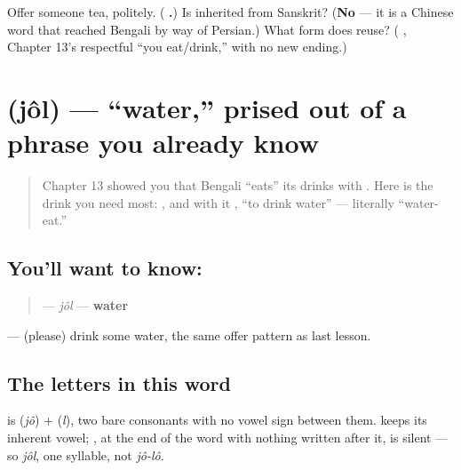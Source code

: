 \begin{tcolorbox}[breakable,colback=teal!4,colframe=teal!35!black,title={Before you move on}]
Offer someone tea, politely. (\textbf{ .}) Is  inherited from Sanskrit? (\textbf{No} — it is a Chinese word that reached Bengali by way of Persian.) What form does   reuse? (\textbf{ }, Chapter 13's respectful \textquotedblleft{}you eat/drink,\textquotedblright{} with no new ending.)
\end{tcolorbox}
\section[\texorpdfstring{\bn{জল} (jôl)}{জল (jôl)}]{ (jôl) — \textquotedblleft{}water,\textquotedblright{} prised out of a phrase you already know}

\label{lesson:BN-C10-jol}



\begin{quote}
Chapter 13 showed you that Bengali \textquotedblleft{}eats\textquotedblright{} its drinks with \textbf{}. Here is the drink you need most: \textbf{}, and with it \textbf{ }, \textquotedblleft{}to drink water\textquotedblright{} — literally \textquotedblleft{}water-eat.\textquotedblright{}
\end{quote}

\subsection*{You'll want to know: }
\begin{quote}
\textbf{} — \emph{jôl} — \textbf{water}
\end{quote}

\textbf{ } — (please) drink some water, the same offer pattern as last lesson.

\subsection*{The letters in this word}
\textbf{} is \textbf{} (\emph{jô}) + \textbf{} (\emph{l}), two bare consonants with no vowel sign between them. \textbf{} keeps its inherent vowel; \textbf{}, at the end of the word with nothing written after it, is silent — so \emph{jôl}, one syllable, not \emph{jô-lô}.

